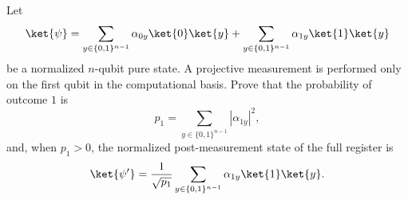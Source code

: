 Let
$$
    \ket{\psi}=\sum_{y\in\{0,1\}^{n-1}}\alpha_{0y}\ket{0}\ket{y}
    +\sum_{y\in\{0,1\}^{n-1}}\alpha_{1y}\ket{1}\ket{y}
$$
be a normalized $n$-qubit pure state.  A projective measurement is performed only on the first qubit in the computational basis.  Prove that the probability of outcome $1$ is
$$
    p_1=\sum_{y\in\{0,1\}^{n-1}}|\alpha_{1y}|^2,
$$
and, when $p_1>0$, the normalized post-measurement state of the full register is
$$
    \ket{\psi'}=\frac{1}{\sqrt{p_1}}
    \sum_{y\in\{0,1\}^{n-1}}\alpha_{1y}\ket{1}\ket{y}.
$$
